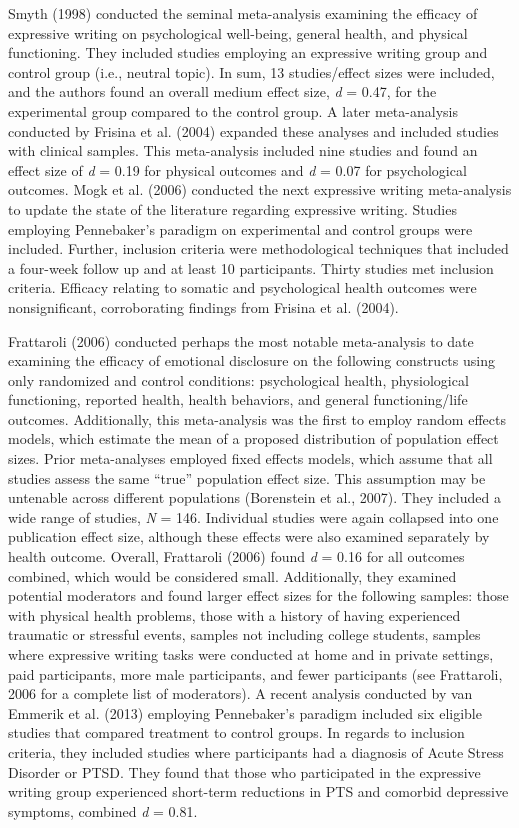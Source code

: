 \documentclass[,man]{apa6}
\begin{document}
Smyth (1998) conducted the seminal meta-analysis examining the efficacy of expressive writing on psychological well-being, general health, and physical functioning. They included studies employing an expressive writing group and control group (i.e., neutral topic). In sum, 13 studies/effect sizes were included, and the authors found an overall medium effect size, \emph{d} = 0.47, for the experimental group compared to the control group. A later meta-analysis conducted by Frisina et al. (2004) expanded these analyses and included studies with clinical samples. This meta-analysis included nine studies and found an effect size of \emph{d} = 0.19 for physical outcomes and \emph{d} = 0.07 for psychological outcomes. Mogk et al. (2006) conducted the next expressive writing meta-analysis to update the state of the literature regarding expressive writing. Studies employing Pennebaker's paradigm on experimental and control groups were included. Further, inclusion criteria were methodological techniques that included a four-week follow up and at least 10 participants. Thirty studies met inclusion criteria. Efficacy relating to somatic and psychological health outcomes were nonsignificant, corroborating findings from Frisina et al. (2004).

Frattaroli (2006) conducted perhaps the most notable meta-analysis to date examining the efficacy of emotional disclosure on the following constructs using only randomized and control conditions: psychological health, physiological functioning, reported health, health behaviors, and general functioning/life outcomes. Additionally, this meta-analysis was the first to employ random effects models, which estimate the mean of a proposed distribution of population effect sizes. Prior meta-analyses employed fixed effects models, which assume that all studies assess the same \enquote{true} population effect size. This assumption may be untenable across different populations (Borenstein et al., 2007). They included a wide range of studies, \emph{N} = 146. Individual studies were again collapsed into one publication effect size, although these effects were also examined separately by health outcome. Overall, Frattaroli (2006) found \emph{d} = 0.16 for all outcomes combined, which would be considered small. Additionally, they examined potential moderators and found larger effect sizes for the following samples: those with physical health problems, those with a history of having experienced traumatic or stressful events, samples not including college students, samples where expressive writing tasks were conducted at home and in private settings, paid participants, more male participants, and fewer participants (see Frattaroli, 2006 for a complete list of moderators). A recent analysis conducted by van Emmerik et al. (2013) employing Pennebaker's paradigm included six eligible studies that compared treatment to control groups. In regards to inclusion criteria, they included studies where participants had a diagnosis of Acute Stress Disorder or PTSD. They found that those who participated in the expressive writing group experienced short-term reductions in PTS and comorbid depressive symptoms, combined \emph{d} = 0.81.
\end{document}
